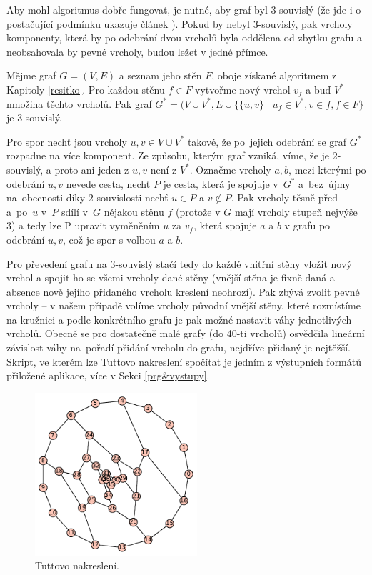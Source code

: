 Aby mohl algoritmus dobře fungovat, je nutné, aby graf byl 3-souvislý (že jde i o postačující podmínku ukazuje článek  \cite{Tutte}). Pokud by nebyl 3-souvislý, pak vrcholy komponenty, která by po odebrání dvou vrcholů byla oddělena od zbytku grafu a neobsahovala by pevné vrcholy, budou ležet v jedné přímce.

\begin{tvrz} \label{prevodNa3Spoj}
Mějme graf $G=(V,E)$ a seznam jeho stěn $F$, oboje získané algoritmem z Kapitoly \ref{resitko}. Pro každou stěnu $f \in F$ vytvořme nový vrchol $v_f$ a buď $V^*$ množina těchto vrcholů.  Pak graf $G^* = (V \cup V^*, E \cup \lbrace \lbrace u,v \rbrace \mid u_f \in V^*, v \in f, f \in F\rbrace$ je 3-souvislý.
\end{tvrz}

\begin{dukaz}
Pro spor nechť jsou vrcholy $u,v  \in V\cup V^*$ takové, že po~jejich odebrání se graf $G^*$ rozpadne na více komponent. Ze způsobu, kterým graf vzniká, víme, že je 2-souvislý, a proto ani jeden z $u,v$ není z $V^*$. Označme vrcholy $a,b$, mezi kterými po odebrání $u,v$ nevede cesta, nechť $P$ je cesta, která je spojuje v~$G^*$ a~bez~újmy na~obecnosti díky 2-souvislosti nechť $u \in P$ a $v \notin P$. Pak vrcholy těsně před a~po~$u$ v~$P$ sdílí v~$G$ nějakou stěnu $f$ (protože v $G$ mají vrcholy stupeň nejvýše 3) a tedy lze P upravit vyměněním $u$ za $v_f$, která spojuje $a$ a $b$ v grafu po odebrání $u,v$, což je spor s volbou $a$ a $b$.
\end{dukaz}

Pro převedení grafu na 3-souvislý stačí tedy do každé vnitřní stěny vložit nový vrchol a spojit ho se všemi vrcholy dané stěny (vnější stěna je fixně daná a absence nově jejího přidaného vrcholu kreslení neohrozí). Pak zbývá zvolit pevné vrcholy -- v našem případě volíme vrcholy původní vnější stěny, které rozmístíme na kružnici a podle konkrétního grafu je pak možné nastavit váhy jednotlivých vrcholů. Obecně se pro dostatečně malé grafy (do 40-ti vrcholů) osvědčila lineární závislost váhy na~pořadí přidání vrcholu do grafu, nejdříve přidaný je nejtěžší. Skript, ve kterém lze Tuttovo nakreslení spočítat je jedním z výstupních formátů přiložené aplikace, více v Sekci \ref{prg&vystupy}.


\begin{figure}[h]\centering
\includegraphics[width = 60mm]{../img/tutteplot}
\caption{Tuttovo nakreslení.}
\label{obr:tutteplot}
\end{figure}